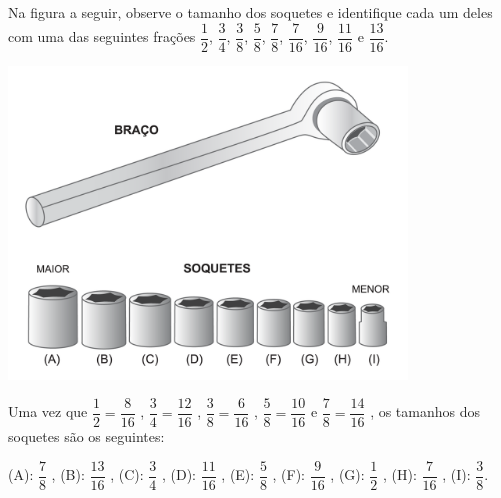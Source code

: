 \documentclass[10 pt,usenames,dvipsnames, oneside]{article}
\begin{document}
Na figura a seguir, observe o tamanho dos soquetes e identifique cada um deles com uma das seguintes frações $\dfrac{1}{2}$, $\dfrac{3}{4}$, $\dfrac{3}{8}$, $\dfrac{5}{8}$, $\dfrac{7}{8}$, $\dfrac{7}{16}$, $\dfrac{9}{16}$, $\dfrac{11}{16}$ e $\dfrac{13}{16}$.

\begin{center}
    \includegraphics[width=300pt, keepaspectratio]{ativ14_fig01.png}
\end{center}

\ifdefined\prof
\begin{solucao}

Uma vez que   $\dfrac{1}{2} = \dfrac{8}{16}$  ,   $\dfrac{3}{4} = \dfrac{12}{16}$
,   $\dfrac{3}{8} = \dfrac{6}{16}$  ,   $\dfrac{5}{8} = \dfrac{10}{16}$   e
$\dfrac{7}{8} = \dfrac{14}{16}$  , os tamanhos dos soquetes são os seguintes:

(A):   $\dfrac{7}{8}$  ,
(B):   $\dfrac{13}{16}$  ,
(C):   $\dfrac{3}{4}$  ,
(D):   $\dfrac{11}{16}$  ,
(E):   $\dfrac{5}{8}$  ,
(F):   $\dfrac{9}{16}$  ,
(G):   $\dfrac{1}{2}$  ,
(H):   $\dfrac{7}{16}$  ,
(I):   $\dfrac{3}{8}$.

\end{solucao}
\fi
\end{document}

